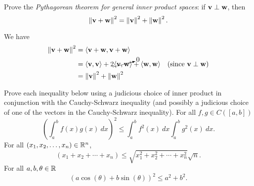 \ii Prove the {\em Pythagorean theorem for general inner product spaces}: if ${\mathbf v}\perp{\mathbf w}$, then 
\[
\left\lVert{\mathbf v}+{\mathbf w}\right\rVert^2=\left\lVert{\mathbf v}\right\rVert^2+\left\lVert{\mathbf w}\right\rVert^2.
\]
\begin{solution}
We have 
\begin{align*}
\left\lVert{\mathbf v}+{\mathbf w}\right\rVert^2&=\langle{\mathbf v}+{\mathbf w},{\mathbf v}+{\mathbf w}\rangle\\
&=\langle{\mathbf v},{\mathbf v}\rangle+2\cancelto{0}{\langle{\mathbf v},{\mathbf w}\rangle}+\langle{\mathbf w},{\mathbf w}\rangle &\text{(since ${\mathbf v}\perp{\mathbf w}$)}\\
&=\left\lVert{\mathbf v}\right\rVert^2+\left\lVert{\mathbf w}\right\rVert^2
\end{align*}
\end{solution}
\ii Prove each inequality below using a judicious choice of inner product in conjunction with the Cauchy-Schwarz inequality (and possibly a judicious choice of one of the vectors in the Cauchy-Schwarz inequality). 
\bb
\ii  For all $f, g\in C([a,b])$
\[
\left(\int_a^b f(x)g(x) \ dx\right)^2\leq \int_a^b f^2(x)\ dx\int_a^b g^2(x) \ dx.\]
\ii For all $(x_1,x_2,\dots, x_n)\in{\mathbb R}^n$,
\[
(x_1+x_2+\cdots +x_n)\leq\sqrt{x_1^2+x_2^2+\cdots +x_n^2}\sqrt{n}. 
\]
\ii For all $a,b,\theta\in{\mathbb R}$ 
\[
(a\cos(\theta)+b\sin(\theta))^2\leq a^2+b^2.
\]

